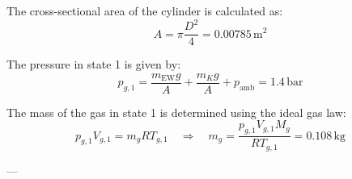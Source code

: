 The cross-sectional area of the cylinder is calculated as:  
\[
A = \pi \frac{D^2}{4} = 0.00785 \, \text{m}^2
\]  

The pressure in state 1 is given by:  
\[
p_{g,1} = \frac{m_{\text{EW}} g}{A} + \frac{m_K g}{A} + p_{\text{amb}} = 1.4 \, \text{bar}
\]  

The mass of the gas in state 1 is determined using the ideal gas law:  
\[
p_{g,1} V_{g,1} = m_g R T_{g,1} \quad \Rightarrow \quad m_g = \frac{p_{g,1} V_{g,1} M_g}{R T_{g,1}} = 0.108 \, \text{kg}
\]  

---